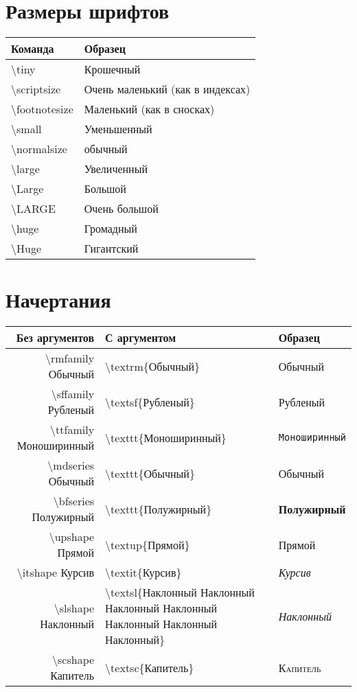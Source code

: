 \documentclass[12pt]{article}
\begin{document}
\section{Размеры шрифтов}

\begin{tabular}{|l|l|}
\hline
\bfseries Команда & \bfseries Образец \\
\hline
\textbackslash tiny & \tiny\strut Крошечный \\
\textbackslash scriptsize & \scriptsize\strut Очень маленький (как в индексах) \\
\textbackslash footnotesize & \footnotesize\strut Маленький (как в сносках) \\
\textbackslash small & \small\strut Уменьшенный \\
\textbackslash normalsize & \normalsize\strut обычный \\
\textbackslash large & \large\strut Увеличенный \\
\textbackslash Large & \Large\strut Большой \\
\textbackslash LARGE & \LARGE\strut Очень большой \\
\textbackslash huge & \huge\strut Громадный \\
\textbackslash Huge & \Huge\strut Гигантский \\
\hline
\end{tabular}


\section{Начертания}

\begin{tabular}{|r|p{5cm}|l|}
\hline
\bfseries Без аргументов & \bfseries С аргументом & \bfseries Образец \\
\hline
\textbackslash rmfamily Обычный & \textbackslash textrm\{Обычный\} & \textrm{Обычный} \\
\textbackslash sffamily Рубленый & \textbackslash textsf\{Рубленый\} & \textsf{Рубленый} \\
\textbackslash ttfamily Моноширинный & \textbackslash texttt\{Моноширинный\} & \texttt{Моноширинный} \\
\textbackslash mdseries Обычный & \textbackslash texttt\{Обычный\} & \textmd{Обычный} \\
\textbackslash bfseries Полужирный & \textbackslash texttt\{Полужирный\} & \textbf{Полужирный} \\
\textbackslash upshape Прямой & \textbackslash textup\{Прямой\} & \textup{Прямой} \\
\textbackslash itshape Курсив & \textbackslash textit\{Курсив\} & \textit{Курсив} \\
\textbackslash slshape Наклонный & \textbackslash textsl\{Наклонный Наклонный Наклонный Наклонный Наклонный Наклонный Наклонный\} & \textsl{Наклонный} \\
\textbackslash scshape Капитель & \textbackslash textsc\{Капитель\} & \textsc{Капитель} \\
\hline
\end{tabular}
\end{document}

